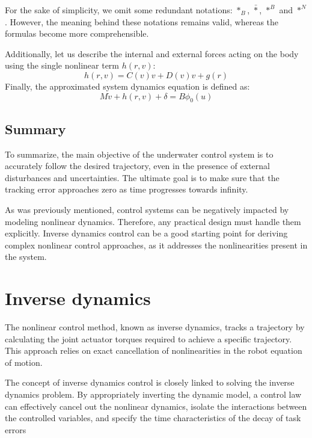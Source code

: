     For the sake of simplicity, we omit some redundant notations: $*_B$, $\bar *$, $*^B$ and $*^N$. 
    However, the meaning behind these notations remains valid, 
    whereas the formulas become more comprehensible.

    Additionally, let us describe the internal and external forces acting on the 
    body using the single nonlinear term $h(r,v)$:
    \begin{equation}
        h(r,v) = C(v)v + D(v)v + g(r)
    \end{equation}
    Finally, the approximated system dynamics equation is defined as:
    \begin{equation}
        M \dot{v} + h(r, v) + \delta = B\phi_0(u)
        \label{eqn::apprx_dynamics}
    \end{equation}

\subsection{Summary}
    To summarize, the main objective of the underwater control system is to accurately 
    follow the desired trajectory, even in the presence of external disturbances 
    and uncertainties. The ultimate goal is to make sure that the tracking error 
    approaches zero as time progresses towards infinity.

    As was previously mentioned, control systems can be negatively impacted 
    by modeling nonlinear dynamics. Therefore, any practical design must handle them explicitly. 
    Inverse dynamics control can be a good starting point for deriving complex nonlinear 
    control approaches, as it addresses the nonlinearities present in the system.

\section{Inverse dynamics}

    The nonlinear control method, known as inverse dynamics, tracks a trajectory by calculating the joint actuator torques required to achieve a specific trajectory. This approach relies on exact cancellation of nonlinearities in the robot equation of motion.

    The concept of inverse dynamics control is closely linked to solving the inverse dynamics problem. By appropriately inverting the dynamic model, a control law can effectively cancel out the nonlinear dynamics, isolate the interactions between the controlled variables, and specify the time characteristics of the decay of task errors

